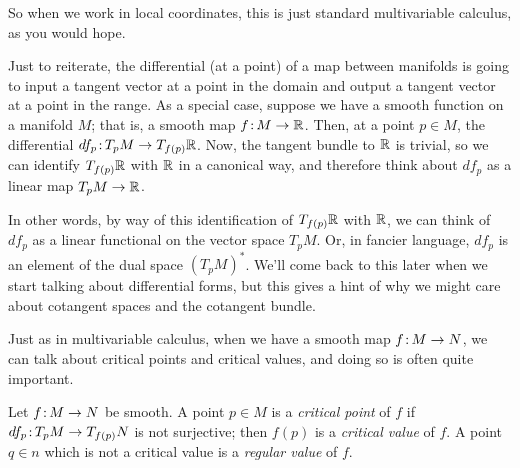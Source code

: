 So when we work in local coordinates, this is just standard multivariable calculus, as you would hope.

Just to reiterate, the differential (at a point) of a map between manifolds is going to input a tangent vector at a point in the domain and output a tangent vector at a point in the range. As a special case, suppose we have a smooth function on a manifold $M$; that is, a smooth map $f \colon\thinspace\!\! M \to \mathbb{R}$. Then, at a point $p \in M$, the differential $df_p \colon\thinspace\!\! T_p M \to T_{f(p)}\mathbb{R}$. Now, the tangent bundle to $\mathbb{R}$ is trivial, so we can identify $T_{f(p)}\mathbb{R}$ with $\mathbb{R}$ in a canonical way, and therefore think about $df_p$ as a linear map $T_pM \to \mathbb{R}$.

In other words, by way of this identification of $T_{f(p)} \mathbb{R}$ with $\mathbb{R}$, we can think of $df_p$ as a linear functional on the vector space $T_pM$. Or, in fancier language, $df_p$ is an element of the dual space $\left(T_pM\right)^\ast$. We'll come back to this later when we start talking about differential forms, but this gives a hint of why we might care about cotangent spaces and the cotangent bundle.

Just as in multivariable calculus, when we have a smooth map $f \colon\thinspace\!\! M \to N$, we can talk about critical points and critical values, and doing so is often quite important.

\begin{definition}\label{def:critical points}
	Let $f \colon\thinspace\!\! M \to N$ be smooth. A point $p \in M$ is a \emph{critical point} of $f$ if $df_p\colon\thinspace\!\! T_p M \to T_{f(p)}N$ is not surjective; then $f(p)$ is a \emph{critical value} of $f$. A point $q \in n$ which is not a critical value is a \emph{regular value} of $f$.
\end{definition}

